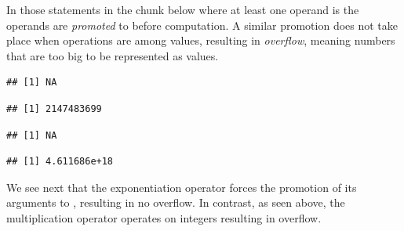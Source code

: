 \documentclass[krantz2]{krantz}\usepackage{knitr}%
\begin{document}
\begin{explainbox}
In those statements in the chunk below where at least one operand is  the  operands are \emph{promoted} to  before computation. A similar promotion does not take place when operations are among  values, resulting in \emph{overflow}, meaning numbers that are too big to be represented as  values.

\begin{knitrout}\footnotesize
{}\color{fgcolor}\begin{kframe}
\begin{alltt}
 \hlopt{+} 
\end{alltt}


{\ttfamily\noindent\color{warningcolor}{\#\# Warning in 2147483600L + 99L: NAs produced by integer overflow}}\begin{verbatim}
## [1] NA
\end{verbatim}
\begin{alltt}
 \hlopt{+} 
\end{alltt}
\begin{verbatim}
## [1] 2147483699
\end{verbatim}
\begin{alltt}
 \hlopt{*} 
\end{alltt}


{\ttfamily\noindent\color{warningcolor}{\#\# Warning in 2147483600L * 2147483600L: NAs produced by integer overflow}}\begin{verbatim}
## [1] NA
\end{verbatim}
\begin{alltt}
 \hlopt{*} 
\end{alltt}
\begin{verbatim}
## [1] 4.611686e+18
\end{verbatim}
\end{kframe}
\end{knitrout}

We see next that the exponentiation operator \Roperator{\^{}} forces the promotion of its arguments to , resulting in no overflow. In contrast, as seen above, the multiplication operator \Roperator{*} operates on integers resulting in overflow.


\end{explainbox}
\end{document}
